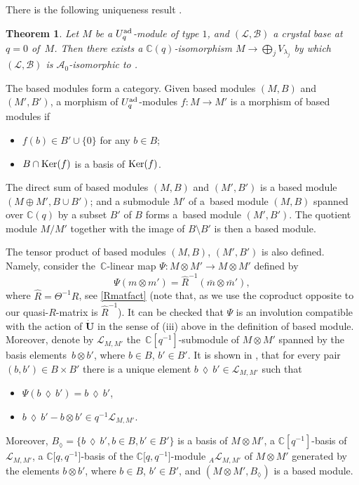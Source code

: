 \documentclass[pdftex]{sigma}
\numberwithin{equation}{section}
\newtheorem{teo}{Theorem}[section]
\theoremstyle{definition}
\newcommand{\mc}{\mathbb{C}}
\newcommand{\Ll}{{\mathcal L}}
\newcommand{\ra}{\rightarrow}
\begin{document}
There is the following uniqueness result \cite[Theorem 3]{Kashiwara1}.

\begin{teo}\label{Kashiuniqueteo} Let $M$ be a $U_q^{\rm ad}$-module of type $1$, and $(\Ll, \mathcal{B})$ a crystal base at $q=0$ of~$M$. Then there exists a $\mc(q)$-isomorphism $M\ra \bigoplus_j V_{\lambda_j}$ by which $(\Ll, \mathcal{B})$ is $\mathcal{A}_0$-isomorphic to \smash{$ \bigoplus_j \big(\Ll_{\lambda_j}^{\rm low}, \mathcal{B}_{\lambda_j}^{\rm low}\big)$}.
\end{teo}

The based modules form a category. Given based modules $(M,B)$ and $(M',B')$, a morphism of $U_q^{\rm ad}$-modules $f\colon M\ra M'$ is a morphism of based modules if{\samepage
\begin{itemize}\itemsep=0pt
\item[(a)] $f(b)\in B'\cup\{0\}$ for any $b\in B$;
\item[(b)] $B\cap {\rm Ker}(f)$ is a basis of ${\rm Ker}(f)$.
\end{itemize}}%

\pagebreak

\noindent
The direct sum of based modules $(M,B)$ and $(M',B')$ is a based module $(M \oplus M',B\cup B')$; and a submodule $M'$ of a~based module $(M,B)$ spanned over $\mc(q)$ by a subset $B'$ of $B$ forms a~based module $(M',B')$. The quotient module $M/M'$ together with the image of $B\setminus B'$ is then a based module.

The tensor product of based modules $(M,B)$, $(M',B')$ is also defined. Namely, consider the~$\mc$-linear map $\Psi\colon M\otimes M' \ra M\otimes M'$ defined by
\[
\Psi(m\otimes m') = \hat{R}^{-1}(\bar{m}\otimes \bar{m}'),
\] where $\hat{R} = \Theta^{-1}R$, see \eqref{Rmatfact} (note that, as we use the coproduct opposite to \cite{Lusztig} our quasi-$R$-matrix is $\hat{R}^{-1}$). It can be checked that $\Psi$ is an involution compatible with the action of $\dot{\mathbf{U}}$ in the sense of (iii) above in the definition of based module. Moreover, denote by $\Ll_{M,M'}$ the~$\mc[q^{-1}]$-submodule of $M\otimes M'$ spanned by the basis elements~$b\otimes b'$, where $b\in B$, $b'\in B'$. It is shown in \cite[Section~27.3]{Lusztig}, that for every pair $(b,b')\in B\times B'$ there is a unique element $b\,\lozenge\, b'\in \Ll_{M,M'}$ such that
\begin{itemize}\itemsep=0pt
\item[(a)] $\Psi(b\,\lozenge\, b')=b\,\lozenge\, b'$,
\item[(b)] $b\,\lozenge\, b' - b\otimes b'\in q^{-1} \mathcal{\Ll}_{M,M'}$.
\end{itemize}
Moreover, $B_{\lozenge} = \{b\,\lozenge\, b', b\in B, b'\in B'\}$ is a basis of $M\otimes M'$, a $\mc[q^{-1}]$-basis of $\Ll_{M,M'}$, a $\mc\big[q,q^{-1}\big]$-basis of the $\mc\big[q,q^{-1}\big]$-module ${}_A\Ll_{M,M'}$ of $M\otimes M'$ generated by the elements $b\otimes b'$, where $b\in B$, $b'\in B'$, and $(M\otimes M',B_{\lozenge})$ is a based module.
\end{document}
